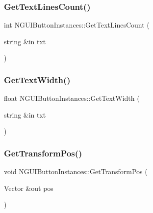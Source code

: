\subsubsection{\texorpdfstring{Get\+Text\+Lines\+Count()}{GetTextLinesCount()}}
{\footnotesize\ttfamily int N\+G\+U\+I\+Button\+Instances\+::\+Get\+Text\+Lines\+Count (\begin{DoxyParamCaption}\item[{string \&in}]{txt }\end{DoxyParamCaption})}

\hypertarget{class_n_g_u_i_button_instances_ae5b01d96a63b7c5ff4568f79392a5f12}{}\label{class_n_g_u_i_button_instances_ae5b01d96a63b7c5ff4568f79392a5f12} 
\subsubsection{\texorpdfstring{Get\+Text\+Width()}{GetTextWidth()}}
{\footnotesize\ttfamily float N\+G\+U\+I\+Button\+Instances\+::\+Get\+Text\+Width (\begin{DoxyParamCaption}\item[{string \&in}]{txt }\end{DoxyParamCaption})}

\hypertarget{class_n_g_u_i_button_instances_aee7c275af20d11e04f6241727b6d2e30}{}\label{class_n_g_u_i_button_instances_aee7c275af20d11e04f6241727b6d2e30} 
\subsubsection{\texorpdfstring{Get\+Transform\+Pos()}{GetTransformPos()}}
{\footnotesize\ttfamily void N\+G\+U\+I\+Button\+Instances\+::\+Get\+Transform\+Pos (\begin{DoxyParamCaption}\item[{Vector \&out}]{pos }\end{DoxyParamCaption})}

\hypertarget{class_n_g_u_i_button_instances_a6df16d199a09d4f28e3529c79d1c64da}{}\label{class_n_g_u_i_button_instances_a6df16d199a09d4f28e3529c79d1c64da} 
